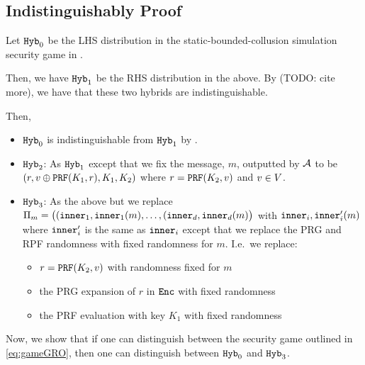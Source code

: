 \subsection{Indistinguishably Proof}
Let $\texttt{Hyb}_0$ be the LHS distribution in the static-bounded-collusion simulation security game in \cite{garg2022dynamic}.

Then, we have $\texttt{Hyb}_1$ be the RHS distribution in the above. By \cite{garg2022dynamic} (TODO: cite more), we have that
these two hybrids are indistinguishable.

Then,
\begin{itemize}
	\item $\texttt{Hyb}_0$ is indistinguishable from $\texttt{Hyb}_1$ by \cite{garg2022dynamic}.
	\item $\texttt{Hyb}_2$: As $\texttt{Hyb}_1$ except that we fix the message, $m$, outputted by $\mathcal{A}$ to be %
		$(r, v \oplus \texttt{PRF}(K_1, r), K_1, K_2)$ where $r = \texttt{PRF}(K_2, v)$ and $v \in V$.
	\item $\texttt{Hyb}_3$: As the above but we replace $\Pi_m = \big((\texttt{inner}_1, \texttt{inner}_1(m), \dots, (\texttt{inner}_d, \texttt{inner}_d(m)\big)$
	with $\texttt{inner}_i, \texttt{inner}'_i(m)$ where $\texttt{inner}'_i$ is the same as $\texttt{inner}_i$ except that we replace the PRG and RPF randomness with fixed randomness
	for $m$. I.e.\ we replace:
	\begin{itemize}
		\item $r = \texttt{PRF}(K_2, v)$ with randomness fixed for $m$
		\item the PRG expansion of $r$ in $\texttt{Enc}$ with fixed randomness
		\item the PRF evaluation with key $K_1$ with fixed randomness
	\end{itemize}
\end{itemize}

Now, we show that if one can distinguish between the security game outlined in \cref{eq:gameGRO}, then one can distinguish
between $\texttt{Hyb}_0$ and $\texttt{Hyb}_3$.

